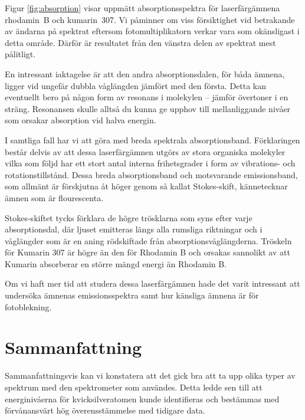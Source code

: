\documentclass[11pt,a4paper]{article}
\begin{document}
Figur \ref{fig:absorption} visar uppmätt absorptionsspektra för
laserfärgämnena rhodamin~B och kumarin~307. Vi påminner om viss
försiktighet vid betrakande av ändarna på spektrat eftersom
fotomultiplikatorn verkar vara som okänsligast i detta område. Därför är
resultatet från den vänstra delen av spektrat mest pålitligt. 


En intressant iaktagelse är att den andra absorptionsdalen, för båda
ämnena, ligger vid ungefär dubbla våglängden jämfört med den
första. Detta kan eventuellt bero på någon form av resonans i
molekylen -- jämför övertoner i en sträng. Resonansen skulle alltså du
kunna ge upphov till mellanliggande nivåer som orsakar absorption vid
halva energin. 

I samtliga fall har vi att göra med breda spektrala
absorptionsband. Förklaringen består delvis av att dessa
laserfärgämnen utgörs av stora organiska molekyler vilka som följd har
ett stort antal interna frihetsgrader i form av vibrations- och
rotationstillstånd. Dessa breda absorptionsband och motsvarande
emissionsband, som allmänt är förskjutna åt höger genom så kallat
Stokes-skift, kännetecknar ämnen som är flourescenta. 

Stokes-skiftet tycks förklara de högre trösklarna som syns efter varje
absorptionsdal, där ljuset emitteras längs alla rumsliga riktningar
och i våglängder som är en aning rödskiftade från
absorptionsvåglängderna. Tröskeln för Kumarin 307 är högre än den för
Rhodamin B och orsakas sannolikt av att Kumarin absorberar en större
mängd energi än Rhodamin B. 

Om vi haft mer tid att studera dessa laserfärgämnen hade det varit
intressant att undersöka ämnenas emissionsspektra samt hur känsliga
ämnena är för fotoblekning.







\section{Sammanfattning}
Sammanfattningsvis kan vi konstatera att det gick bra
att ta upp olika typer av spektrum med den spektrometer som
användes. Detta ledde sen till att energinivåerna för
kvicksilveratomen kunde identifieras och bestämmas med förvånansvärt
hög överensstämmelse med tidigare data. 
\end{document}
